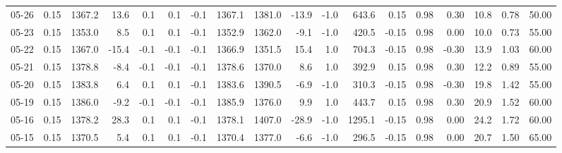 \begin{threeparttable}
{\begin{tabular}{lrrrrrrrrrrrrrrrrr}
  05-26 &     0.15 & 1367.2 &              13.6 &               0.1 &                0.1 &               -0.1 & 1367.1 & 1381.0 &      -13.9 &                     -1.0 &               643.6 &       0.15 &      0.98 &           0.30 &             10.8 &            0.78 &                  50.00 \\
  05-23 &     0.15 & 1353.0 &               8.5 &               0.1 &                0.1 &               -0.1 & 1352.9 & 1362.0 &       -9.1 &                     -1.0 &               420.5 &      -0.15 &      0.98 &           0.00 &             10.0 &            0.73 &                  55.00 \\
  05-22 &     0.15 & 1367.0 &             -15.4 &              -0.1 &               -0.1 &               -0.1 & 1366.9 & 1351.5 &       15.4 &                      1.0 &               704.3 &      -0.15 &      0.98 &          -0.30 &             13.9 &            1.03 &                  60.00 \\
  05-21 &     0.15 & 1378.8 &              -8.4 &              -0.1 &               -0.1 &               -0.1 & 1378.6 & 1370.0 &        8.6 &                      1.0 &               392.9 &       0.15 &      0.98 &           0.30 &             12.2 &            0.89 &                  55.00 \\
  05-20 &     0.15 & 1383.8 &               6.4 &               0.1 &                0.1 &               -0.1 & 1383.6 & 1390.5 &       -6.9 &                     -1.0 &               310.3 &      -0.15 &      0.98 &          -0.30 &             19.8 &            1.42 &                  55.00 \\
  05-19 &     0.15 & 1386.0 &              -9.2 &              -0.1 &               -0.1 &               -0.1 & 1385.9 & 1376.0 &        9.9 &                      1.0 &               443.7 &       0.15 &      0.98 &           0.30 &             20.9 &            1.52 &                  60.00 \\
  05-16 &     0.15 & 1378.2 &              28.3 &               0.1 &                0.1 &               -0.1 & 1378.1 & 1407.0 &      -28.9 &                     -1.0 &              1295.1 &      -0.15 &      0.98 &           0.00 &             24.2 &            1.72 &                  60.00 \\
  05-15 &     0.15 & 1370.5 &               5.4 &               0.1 &                0.1 &               -0.1 & 1370.4 & 1377.0 &       -6.6 &                     -1.0 &               296.5 &      -0.15 &      0.98 &           0.00 &             20.7 &            1.50 &                  65.00 \\

\end{tabular}}
\end{threeparttable}

